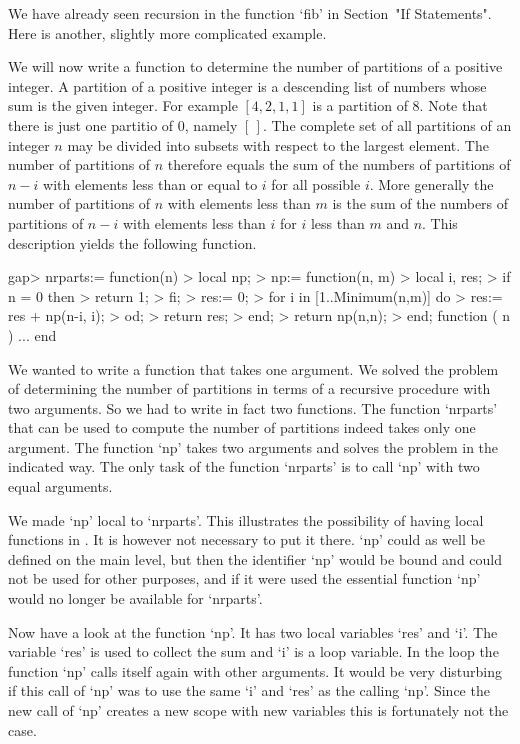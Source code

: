 
We have already seen recursion in the function `fib'
in Section~"If Statements".
Here is another, slightly more complicated example.

We will now write a function to determine  the number of partitions of
a positive integer.  A partition of a positive integer is a descending
list  of numbers   whose sum   is the   given   integer.  For  example
$[4,2,1,1]$ is a partition of 8.  Note that there is just one partitio
of 0, namely $[\,]$. The complete set of all  partitions of an integer
$n$ may be divided  into subsets with respect  to the largest element.
The number  of  partitions of   $n$ therefore  equals  the  sum of the
numbers of partitions of $n-i$ with elements less than or equal to $i$
for all possible $i$.  More generally the  number of partitions of $n$
with elements less than $m$ is the sum of the numbers of partitions of
$n-i$ with elements less than $i$ for $i$ less than $m$ and $n$.  This
description yields the following function.

\beginexample
gap> nrparts:= function(n)
>    local np;
>    np:= function(n, m)
>       local i, res;
>       if n = 0 then
>          return 1;
>       fi;
>       res:= 0;
>       for i in [1..Minimum(n,m)] do
>          res:= res + np(n-i, i);
>       od;
>       return res;
>    end;
>    return np(n,n);
> end;
function ( n ) ... end
\endexample

We wanted to  write a function that  takes one argument.   We solved  the
problem of determining the number  of partitions in  terms of a recursive
procedure with two arguments.  So we had to write  in fact two functions.
The  function  `nrparts' that  can  be  used  to  compute the  number  of
partitions indeed takes only one  argument.  The  function `np' takes two
arguments and solves the problem in the indicated way.  The  only task of
the function `nrparts' is to call `np' with two equal arguments.

We made `np' local to `nrparts'.  This  illustrates the possibility of
having local functions in {\GAP}.  It is  however not necessary to put
it there.  `np' could as well  be defined on  the main level, but then
the  identifier `np' would  be bound and could   not be used for other
purposes, and if  it were used  the  essential function `np' would  no
longer be available for `nrparts'.

Now have a look at the function `np'. It has two local variables `res'
and `i'. The  variable `res' is  used to collect the sum  and `i' is a
loop  variable. In the loop the  function `np' calls itself again with
other arguments. It would be very disturbing if this call of `np' was
to use the same `i' and `res' as the calling `np'.  Since the new call
of `np' creates a new scope with new variables this is fortunately not
the case.

